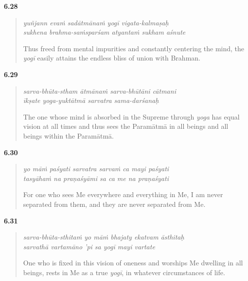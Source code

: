 \par\noindent\textbf{6.28}\par
\begin{verse}
\textit{yuñjann evaṁ sadātmānaṁ yogī vigata-kalmaṣaḥ} \\
\textit{sukhena brahma-saṁsparśam atyantaṁ sukham aśnute}

\noindent Thus freed from mental impurities and constantly centering the mind, the \textit{yogī} easily attains the endless bliss of union with Brahman.
\end{verse}
\par



\par\noindent\textbf{6.29}\par
\begin{verse}
\textit{sarva-bhūta-stham ātmānaṁ sarva-bhūtāni cātmani} \\
\textit{īkṣate yoga-yuktātmā sarvatra sama-darśanaḥ}

\noindent The one whose mind is absorbed in the Supreme through \textit{yoga} has equal vision at all times and thus sees the Paramātmā in all beings and all beings within the Paramātmā.
\end{verse}
\par



\par\noindent\textbf{6.30}\par
\begin{verse}
\textit{yo māṁ paśyati sarvatra sarvaṁ ca mayi paśyati} \\
\textit{tasyāhaṁ na praṇaśyāmi sa ca me na praṇaśyati}

\noindent For one who sees Me everywhere and everything in Me, I am never separated from them, and they are never separated from Me.
\end{verse}
\par



\par\noindent\textbf{6.31}\par
\begin{verse}
\textit{sarva-bhūta-sthitaṁ yo māṁ bhajaty ekatvam āsthitaḥ} \\
\textit{sarvathā vartamāno ’pi sa yogī mayi vartate}

\noindent One who is fixed in this vision of oneness and worships Me dwelling in all beings, rests in Me as a true \textit{yogī}, in whatever circumstances of life.
\end{verse}
\par



